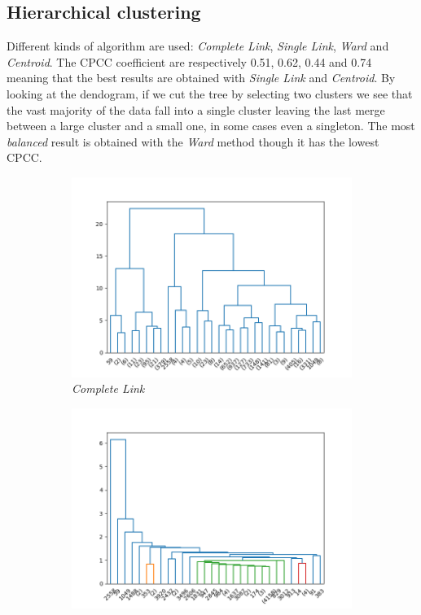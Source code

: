 \subsection{Hierarchical clustering}
Different kinds of algorithm are used: \emph{Complete Link}, \emph{Single Link}, \emph{Ward} and \emph{Centroid}. The CPCC coefficient are respectively 0.51, 0.62, 0.44 and 0.74 meaning that the best results are obtained with \emph{Single Link} and \emph{Centroid}. By looking at the dendogram, if we cut the tree by selecting two clusters we see that the vast majority of the data fall into a single cluster leaving the last merge between a large cluster and a small one, in some cases even a singleton. The most \emph{balanced} result is obtained with the \emph{Ward} method though it has the lowest CPCC.

\begin{figure}[h!]
    \centering
    \begin{subfigure}{0.49\textwidth}
        \centering
        \includegraphics[width=0.9\linewidth]{img/clust_1/c_link.png}
        \caption{\emph{Complete Link}}
        \label{fig:clink_img}
    \end{subfigure}
    \begin{subfigure}{0.49\textwidth}
        \centering
        \includegraphics[width=0.9\linewidth]{img/clust_1/s_link.png}

\end{subfigure}
\end{figure}
